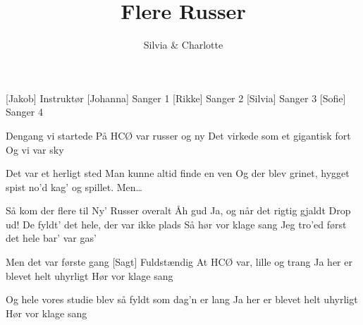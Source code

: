 \documentclass[a4paper,11pt]{article}
\title{Flere Russer}
\author{Silvia \& Charlotte }
\begin{document}
\maketitle

\begin{roles}
[Jakob] Instruktør
[Johanna] Sanger 1
[Rikke] Sanger 2
[Silvia] Sanger 3
[Sofie] Sanger 4
\end{roles}

\begin{song}


 Dengang vi startede
På HCØ var russer og ny
Det virkede som et gigantisk fort
Og vi var sky

 Det var et herligt sted
Man kunne altid finde en ven
 Og der blev grinet, hygget spist no’d kag’ og spillet. 
Men…

 Så kom der flere til
 Ny’ Russer overalt
Åh gud
 Ja, og når det rigtig gjaldt
 Drop ud!
 De fyldt’ det hele, der var ikke plads
Så hør vor klage sang
 Jeg tro’ed først det hele bar’  var gas’

 Men det var første gang
[Sagt] Fuldstændig
 At HCØ var, lille og trang
 Ja her er blevet helt uhyrligt
Hør vor klage sang

 Og hele vores studie blev så 
fyldt som dag'n er lang
Ja her er blevet helt uhyrligt
Hør vor klage sang

\end{song}
\end{document}

